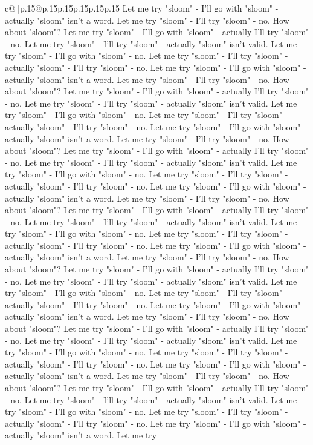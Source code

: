 \documentclass{article}
\begin{document}
{\begin{supertabular}{c@{$\;$}|p{.15\linewidth}@{}p{.15\linewidth}p{.15\linewidth}p{.15\linewidth}p{.15\linewidth}p{.15\linewidth}}
{{{Let me try "sloom" {-} I'll go with "sloom" {-} actually "sloom" isn't a word. Let me try "sloom" {-} I'll try "sloom" {-} no. How about "sloom"? Let me try "sloom" {-} I'll go with "sloom" {-} actually I'll try "sloom" {-} no. Let me try "sloom" {-} I'll try "sloom" {-} actually "sloom" isn't valid. Let me try "sloom" {-} I'll go with "sloom" {-} no. Let me try "sloom" {-} I'll try "sloom" {-} actually "sloom" {-} I'll try "sloom" {-} no. Let me try "sloom" {-} I'll go with "sloom" {-} actually "sloom" isn't a word. Let me try "sloom" {-} I'll try "sloom" {-} no. How about "sloom"? Let me try "sloom" {-} I'll go with "sloom" {-} actually I'll try "sloom" {-} no. Let me try "sloom" {-} I'll try "sloom" {-} actually "sloom" isn't valid. Let me try "sloom" {-} I'll go with "sloom" {-} no. Let me try "sloom" {-} I'll try "sloom" {-} actually "sloom" {-} I'll try "sloom" {-} no. Let me try "sloom" {-} I'll go with "sloom" {-} actually "sloom" isn't a word. Let me try "sloom" {-} I'll try "sloom" {-} no. How about "sloom"? Let me try "sloom" {-} I'll go with "sloom" {-} actually I'll try "sloom" {-} no. Let me try "sloom" {-} I'll try "sloom" {-} actually "sloom" isn't valid. Let me try "sloom" {-} I'll go with "sloom" {-} no. Let me try "sloom" {-} I'll try "sloom" {-} actually "sloom" {-} I'll try "sloom" {-} no. Let me try "sloom" {-} I'll go with "sloom" {-} actually "sloom" isn't a word. Let me try "sloom" {-} I'll try "sloom" {-} no. How about "sloom"? Let me try "sloom" {-} I'll go with "sloom" {-} actually I'll try "sloom" {-} no. Let me try "sloom" {-} I'll try "sloom" {-} actually "sloom" isn't valid. Let me try "sloom" {-} I'll go with "sloom" {-} no. Let me try "sloom" {-} I'll try "sloom" {-} actually "sloom" {-} I'll try "sloom" {-} no. Let me try "sloom" {-} I'll go with "sloom" {-} actually "sloom" isn't a word. Let me try "sloom" {-} I'll try "sloom" {-} no. How about "sloom"? Let me try "sloom" {-} I'll go with "sloom" {-} actually I'll try "sloom" {-} no. Let me try "sloom" {-} I'll try "sloom" {-} actually "sloom" isn't valid. Let me try "sloom" {-} I'll go with "sloom" {-} no. Let me try "sloom" {-} I'll try "sloom" {-} actually "sloom" {-} I'll try "sloom" {-} no. Let me try "sloom" {-} I'll go with "sloom" {-} actually "sloom" isn't a word. Let me try "sloom" {-} I'll try "sloom" {-} no. How about "sloom"? Let me try "sloom" {-} I'll go with "sloom" {-} actually I'll try "sloom" {-} no. Let me try "sloom" {-} I'll try "sloom" {-} actually "sloom" isn't valid. Let me try "sloom" {-} I'll go with "sloom" {-} no. Let me try "sloom" {-} I'll try "sloom" {-} actually "sloom" {-} I'll try "sloom" {-} no. Let me try "sloom" {-} I'll go with "sloom" {-} actually "sloom" isn't a word. Let me try "sloom" {-} I'll try "sloom" {-} no. How about "sloom"? Let me try "sloom" {-} I'll go with "sloom" {-} actually I'll try "sloom" {-} no. Let me try "sloom" {-} I'll try "sloom" {-} actually "sloom" isn't valid. Let me try "sloom" {-} I'll go with "sloom" {-} no. Let me try "sloom" {-} I'll try "sloom" {-} actually "sloom" {-} I'll try "sloom" {-} no. Let me try "sloom" {-} I'll go with "sloom" {-} actually "sloom" isn't a word. Let me try }}}
\end{supertabular}}
\end{document}

